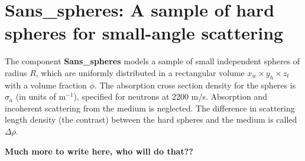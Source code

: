 \section{Sans\_spheres: A sample of hard spheres for small-angle scattering}
\label{sans}


The component {\bf Sans\_spheres} models a sample of small independent
spheres of radius $R$, which are uniformly distributed
in a rectangular volume $x_w \times y_h \times z_t$ with a volume
fraction $\phi$. The absorption cross section density for the spheres
is $\sigma_a$ (in units of m$^{-1}$), specified  
for neutrons at 2200 m/s. Absorption and incoherent scattering from the medium
is neglected.
The difference in scattering length density
(the contrast) between the hard spheres and the medium is called $\Delta \rho$.
 
{\bf Much more to write here, who will do that??}